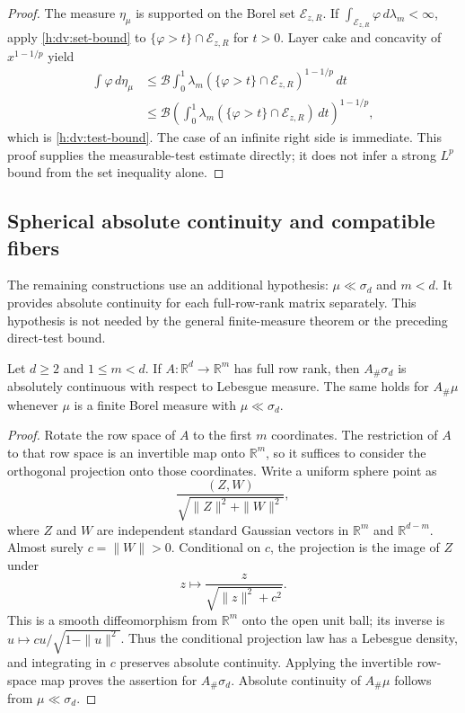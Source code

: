 \begin{proof}
The measure \(\eta_\mu\) is supported on the Borel set
\(\mathcal E_{z,R}\).  If
\(\int_{\mathcal E_{z,R}}\varphi\,d\lambda_m<\infty\), apply
\eqref{h:dv:set-bound} to
\(\{\varphi>t\}\cap\mathcal E_{z,R}\) for \(t>0\).  Layer cake and
concavity of \(x^{1-1/p}\) yield
\begin{align*}
 \int\varphi\,d\eta_\mu
 &\le\mathcal B\int_0^1
   \lambda_m(\{\varphi>t\}\cap\mathcal E_{z,R})^{1-1/p}\,dt\\
 &\le\mathcal B
   \left(\int_0^1
   \lambda_m(\{\varphi>t\}\cap\mathcal E_{z,R})\,dt\right)^{1-1/p},
\end{align*}
which is \eqref{h:dv:test-bound}.  The case of an infinite right side
is immediate.  This proof supplies the measurable-test estimate
directly; it does not infer a strong \(L^p\) bound from the set
inequality alone.
\end{proof}

\subsection{Spherical absolute continuity and compatible fibers}

The remaining constructions use an additional hypothesis:
\(\mu\ll\sigma_d\) and \(m<d\). It provides absolute continuity for
each full-row-rank matrix separately. This hypothesis is not needed
by the general finite-measure theorem or the preceding direct-test
bound.

\begin{lemma}
\label{h:dv:gaussian-ac}
Let \(d\ge2\) and \(1\le m<d\).  If \(A:\mathbb R^d\to\mathbb R^m\)
has full row rank, then \(A_\#\sigma_d\) is absolutely continuous with
respect to Lebesgue measure.  The same holds for \(A_\#\mu\) whenever
\(\mu\) is a finite Borel measure with \(\mu\ll\sigma_d\).
\end{lemma}

\begin{proof}
Rotate the row space of \(A\) to the first \(m\) coordinates.  The
restriction of \(A\) to that row space is an invertible map onto
\(\mathbb R^m\), so it suffices to consider the orthogonal projection
onto those coordinates.  Write a uniform sphere point as
\[
 \frac{(Z,W)}{\sqrt{\|Z\|^2+\|W\|^2}},
\]
where \(Z\) and \(W\) are independent standard Gaussian vectors in
\(\mathbb R^m\) and \(\mathbb R^{d-m}\).  Almost surely
\(c=\|W\|>0\).  Conditional on \(c\), the projection is the image of
\(Z\) under
\[
 z\longmapsto\frac{z}{\sqrt{\|z\|^2+c^2}}.
\]
This is a smooth diffeomorphism from \(\mathbb R^m\) onto the open
unit ball; its inverse is
\(u\mapsto cu/\sqrt{1-\|u\|^2}\).  Thus the conditional projection law
has a Lebesgue density, and integrating in \(c\) preserves absolute
continuity.  Applying the invertible row-space map proves the assertion
for \(A_\#\sigma_d\).  Absolute continuity of \(A_\#\mu\) follows from
\(\mu\ll\sigma_d\).
\end{proof}

